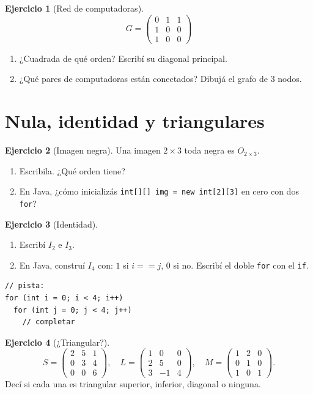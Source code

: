 \documentclass[a4paper,12pt]{article}
\theoremstyle{definition}
\newtheorem{ejercicio}{Ejercicio}[section]
\begin{document}
\begin{ejercicio}[Red de computadoras]
\[
G = \begin{pmatrix}
0 & 1 & 1 \\
1 & 0 & 0 \\
1 & 0 & 0
\end{pmatrix}
\]
\begin{enumerate}[label=\alph*)]
\item ¿Cuadrada de qué orden? Escribí su diagonal principal.
\item ¿Qué pares de computadoras están conectados? Dibujá el grafo de 3 nodos.
\end{enumerate}
\end{ejercicio}

\section{Nula, identidad y triangulares}
\begin{ejercicio}[Imagen negra]
Una imagen $2 \times 3$ toda negra es $O_{2 \times 3}$.
\begin{enumerate}[label=\alph*)]
\item Escribila. ¿Qué orden tiene?
\item En Java, ¿cómo inicializás \texttt{int[][] img = new int[2][3]} en cero con dos \texttt{for}?
\end{enumerate}
\end{ejercicio}

\begin{ejercicio}[Identidad]
\begin{enumerate}[label=\alph*)]
\item Escribí $I_2$ e $I_3$.
\item En Java, construí $I_4$ con: $1$ si $i==j$, $0$ si no. Escribí el doble \texttt{for} con el \texttt{if}.
\end{enumerate}
\begin{lstlisting}
// pista:
for (int i = 0; i < 4; i++)
  for (int j = 0; j < 4; j++)
    // completar
\end{lstlisting}
\end{ejercicio}

\begin{ejercicio}[¿Triangular?]
\[
S = \begin{pmatrix} 2 & 5 & 1 \\ 0 & 3 & 4 \\ 0 & 0 & 6 \end{pmatrix}, \quad
L = \begin{pmatrix} 1 & 0 & 0 \\ 2 & 5 & 0 \\ 3 & -1 & 4 \end{pmatrix}, \quad
M = \begin{pmatrix} 1 & 2 & 0 \\ 0 & 1 & 0 \\ 1 & 0 & 1 \end{pmatrix}.
\]
Decí si cada una es triangular superior, inferior, diagonal o ninguna.
\end{ejercicio}
\end{document}
